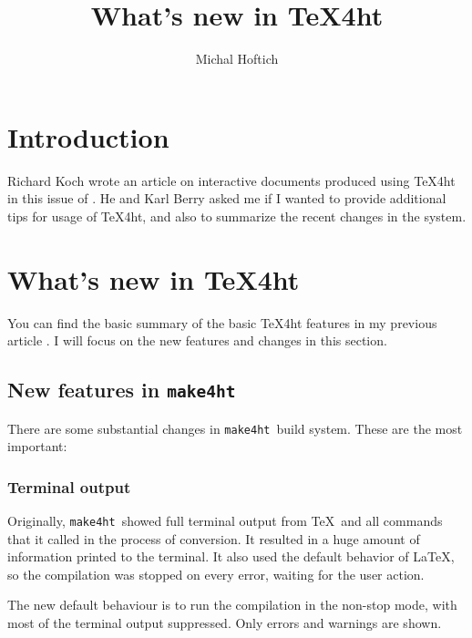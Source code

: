 \documentclass{ltugboat}
\title{What's new in \TeX4ht}
\author{Michal Hoftich}
\newcommand\makefourht{\texttt{make4ht}}
\begin{document}
\maketitle

\begin{abstract}
\end{abstract}

\section{Introduction}

Richard Koch wrote an article on interactive documents produced using
\TeX4ht in this issue of \TUB. He and Karl Berry asked me if I wanted 
to provide additional tips for usage of \TeX4ht, and also to summarize
the recent changes in the system.


\hypertarget{Whatux27sux20newux20inux20TeX4ht}{%
\section{What's new in TeX4ht}\label{Whatux27sux20newux20inux20TeX4ht}}

You can find the basic summary of the basic \TeX4ht features in my previous article
\cite{Hoftich:2019:TLW}. I will focus on the new features and changes in this section.

\subsection{New features in \makefourht}

There are some substantial changes in \makefourht\ build system. These are the
most important:

\subsubsection{Terminal output}

Originally, \makefourht\ showed full terminal output from \TeX\ and all
commands that it called in the process of conversion. It resulted in a huge 
amount of information printed to the terminal. It also used the default 
behavior of \LaTeX, so the compilation was stopped on every error, waiting
for the user action.

The new default behaviour is to run the compilation in the non-stop mode, 
with most of the terminal output suppressed. Only errors and warnings are 
shown. 
\end{document}
